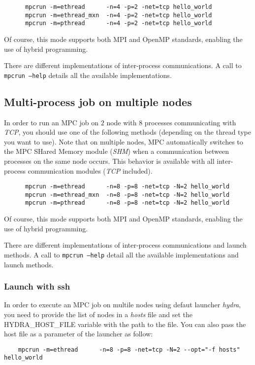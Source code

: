 \documentclass[a4paper,11pt]{article}
\begin{document}
\begin{verbatim}
      mpcrun -m=ethread      -n=4 -p=2 -net=tcp hello_world
      mpcrun -m=ethread_mxn  -n=4 -p=2 -net=tcp hello_world
      mpcrun -m=pthread      -n=4 -p=2 -net=tcp hello_world
\end{verbatim}

Of course, this mode supports both MPI and OpenMP standards, enabling the use of hybrid programming.

There are different implementations of inter-process communications.
A call to {\tt mpcrun --help} details all the available implementations.

\subsection{Multi-process job on multiple nodes}
In order to run an MPC job on $2$ node with $8$ processes communicating with \emph{TCP}, you should use one of the following methods (depending on the thread type you want to use). Note that on multiple nodes, MPC automatically switches to the MPC SHared Memory module (\emph{SHM}) when a communication between processes on the same node occurs. This behavior is available with all inter-process communication modules (\emph{TCP} included).

\begin{verbatim}
      mpcrun -m=ethread      -n=8 -p=8 -net=tcp -N=2 hello_world
      mpcrun -m=ethread_mxn  -n=8 -p=8 -net=tcp -N=2 hello_world
      mpcrun -m=pthread      -n=8 -p=8 -net=tcp -N=2 hello_world
\end{verbatim}

Of course, this mode supports both MPI and OpenMP standards, enabling the use of hybrid programming.

There are different implementations of inter-process communications and launch methods.
A call to {\tt mpcrun --help} detail all the available implementations and launch methods.

\subsubsection{Launch with ssh}
In order to execute an MPC job on multile nodes using defaut launcher \emph{hydra}, you need to provide the list of nodes in a \emph{hosts} file and set the HYDRA\_HOST\_FILE variable with the path to the file.
You can also pass the host file as a parameter of the launcher as follow:

\begin{verbatim}
	mpcrun -m=ethread      -n=8 -p=8 -net=tcp -N=2 --opt="-f hosts" hello_world
\end{verbatim}
\end{document}
